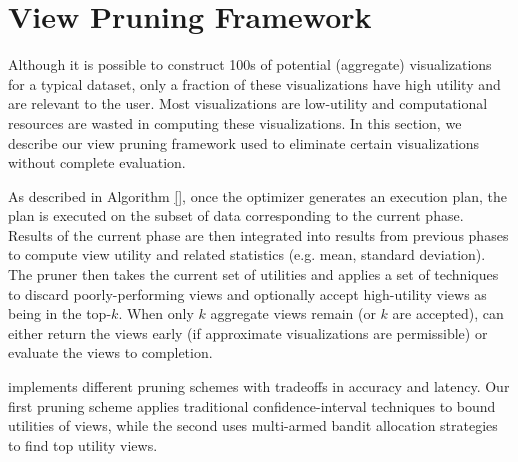 
\section{View Pruning Framework}
\label{sec:pruning_framework}
Although it is possible to construct 100s of potential (aggregate)
visualizations for a typical dataset, only a fraction of these visualizations have high utility and are relevant to the user.
Most visualizations are low-utility and computational resources
are wasted in computing these visualizations.
In this section, we describe our view pruning framework used to 
eliminate certain visualizations without complete evaluation.

\label{subsec:basic_framework}
As described in Algorithm \ref{}, once the \SeeDB optimizer 
generates an execution plan, the plan is executed 
on the subset of data corresponding to the
current phase.
Results of the current phase are then integrated into results
from previous phases to compute view utility and related statistics
(e.g. mean, standard deviation).
The \SeeDB pruner then takes the current set of utilities and applies
a set of techniques to discard poorly-performing views and
optionally accept high-utility views as being in the top-$k$.
When only $k$ aggregate views remain (or $k$ are accepted), \SeeDB
can either return the views early (if approximate visualizations are permissible) or evaluate the views to completion.

\SeeDB implements different pruning schemes with tradeoffs in
accuracy and latency.
Our first pruning scheme applies traditional confidence-interval
techniques to bound utilities of views, while the second uses
multi-armed bandit allocation strategies to find top utility views.

